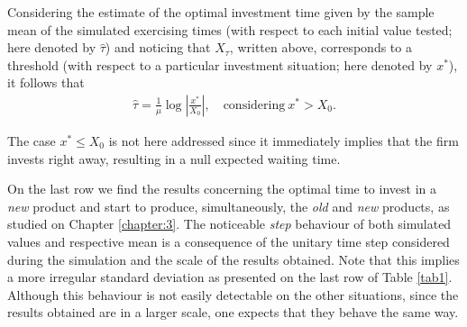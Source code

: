 Considering the estimate of the optimal investment time given by the sample mean of the simulated exercising times (with respect to each initial value tested; here denoted by $\hat{\tau}$) and noticing that $X_\tau$, written above, corresponds to a threshold (with respect to a particular investment situation; here denoted by $x^*$), it follows that
\begin{align}
 \hat{\tau}=\frac{1}{\mu} \log \left|  \frac{x^*}{X_0} \right|, \quad \text{considering} \ x^*> X_0.
\end{align}

The case $x^*\leq X_0$ is not here addressed since it immediately implies that the firm invests right away, resulting in a null expected waiting time.





On the last row we find the results concerning the optimal time to invest in a \textit{new} product and start to produce, simultaneously, the \textit{old} and \textit{new} products, as studied on Chapter \ref{chapter:3}.
The noticeable \textit{step} behaviour of both simulated values and respective mean is a consequence of the unitary time step considered during the simulation and the scale of the results obtained. Note that this implies a more irregular standard deviation as presented on the last row of Table \ref{tab1}.
Although this behaviour is not easily detectable on the other situations, since the results obtained are in a larger scale, one expects that they behave the same way.


